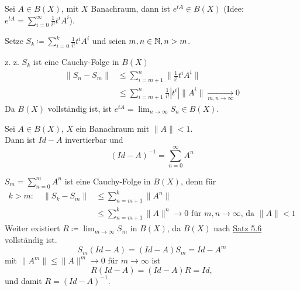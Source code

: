 \begin{bemerkung}[Exponentialfunktion]
	Sei $A \in B(X)$, mit $X$ Banachraum, dann ist $e^{tA} \in B(X)$ (Idee: $e^{tA} = \sum_{i = 0}^{\infty} \frac{1}{i!} t^{i} A^{i}$).
	\begin{beweis}
		Setze $S_{k} \coloneqq \sum_{i = 0}^{k} \frac{1}{i!} t^{i} A^{i}$ und seien $m, n \in \mathbb{N}, n > m$.
	
		z. z. $S_{k}$ ist eine Cauchy-Folge in $B(X)$
		\begin{align*}
			\| S_{n} - S_{m} \| & \leq \sum_{i = m + 1}^{n} \| \frac{1}{i!} t^{i} A^{i} \| \\
				& \leq \sum_{i = m +1}^{n}  \frac{1}{i!} | t^{i} | \| A^{i} \| \xrightarrow[m, n \rightarrow \infty]{} 0
		\end{align*}
		Da $B(X)$ vollständig ist, ist $e^{tA} = \lim_{n \rightarrow \infty} S_{n} \in B(X)$.	
	\end{beweis}
\end{bemerkung}


\begin{prop} \label{prop:5.8-NeumannscheReihe}
	Sei $A \in B(X)$, $X$ ein Banachraum mit $\| A \| < 1$. \\
	Dann ist $Id - A$ invertierbar und 
	\[ \left( Id - A \right)^{-1} = \sum_{n = 0}^{\infty} A^{n} \]
	\begin{beweis}
		$S_{m} = \sum_{n = 0}^{m} A^{n}$ ist eine Cauchy-Folge in $B(X)$, denn für
		\begin{align*}
		k > m: \quad \| S_{k} - S_{m} \| & \leq \sum_{n = m + 1}^{k} \| A^{n} \| \\
			& \leq \sum_{n = m + 1}^{k} \| A \|^{n} \rightarrow 0 \text{ für } m, n \rightarrow \infty \text{, da } \| A \| < 1
		\end{align*}
		Weiter existiert $R \coloneqq \lim_{m \rightarrow \infty} S_{m}$ in $B(X)$, da $B(X)$ nach \hyperref[satz:5.6]{Satz 5.6} vollständig ist.
		\[ S_{m} (Id - A) = (Id - A) S_{m} = Id - A^{m} \]
		mit $\| A^{m} \| \leq \| A \|^{m} \rightarrow 0 \text{ für } m \rightarrow \infty$ ist
		\[ R (Id - A) = (Id - A) R = Id, \]
		und damit $R = (Id - A)^{-1}$.
	\end{beweis}
\end{prop}


